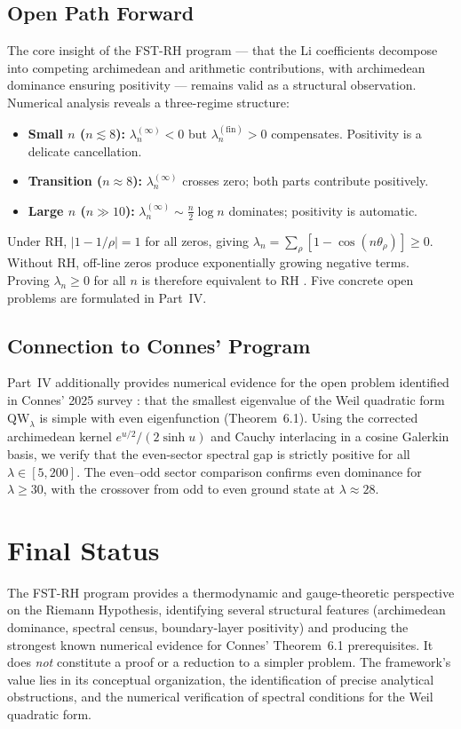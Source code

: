 \documentclass[12pt,a4paper]{article}
\begin{document}
\subsection{Open Path Forward}
The core insight of the FST-RH program --- that the Li coefficients decompose into competing archimedean and arithmetic contributions, with archimedean dominance ensuring positivity --- remains valid as a structural observation. Numerical analysis reveals a three-regime structure:
\begin{itemize}
  \item \textbf{Small $n$ ($n \lesssim 8$):} $\lambda_n^{(\infty)} < 0$ but $\lambda_n^{(\mathrm{fin})} > 0$ compensates. Positivity is a delicate cancellation.
  \item \textbf{Transition ($n \approx 8$):} $\lambda_n^{(\infty)}$ crosses zero; both parts contribute positively.
  \item \textbf{Large $n$ ($n \gg 10$):} $\lambda_n^{(\infty)} \sim \frac{n}{2}\log n$ dominates; positivity is automatic.
\end{itemize}
Under RH, $|1-1/\rho| = 1$ for all zeros, giving $\lambda_n = \sum_\rho [1 - \cos(n\theta_\rho)] \ge 0$. Without RH, off-line zeros produce exponentially growing negative terms. Proving $\lambda_n \ge 0$ for all $n$ is therefore equivalent to RH \cite{Li1997}. Five concrete open problems are formulated in Part~IV.

\subsection{Connection to Connes' Program}
Part~IV additionally provides numerical evidence for the open problem identified in Connes' 2025 survey \cite{Connes2025}: that the smallest eigenvalue of the Weil quadratic form $\mathrm{QW}_\lambda$ is simple with even eigenfunction (Theorem~6.1). Using the corrected archimedean kernel $e^{u/2}/(2\sinh u)$ and Cauchy interlacing in a cosine Galerkin basis, we verify that the even-sector spectral gap is strictly positive for all $\lambda \in [5,200]$. The even--odd sector comparison confirms even dominance for $\lambda \ge 30$, with the crossover from odd to even ground state at $\lambda \approx 28$.

\section{Final Status}
The FST-RH program provides a thermodynamic and gauge-theoretic perspective on the Riemann Hypothesis, identifying several structural features (archimedean dominance, spectral census, boundary-layer positivity) and producing the strongest known numerical evidence for Connes' Theorem~6.1 prerequisites. It does \emph{not} constitute a proof or a reduction to a simpler problem. The framework's value lies in its conceptual organization, the identification of precise analytical obstructions, and the numerical verification of spectral conditions for the Weil quadratic form.



\end{document}
